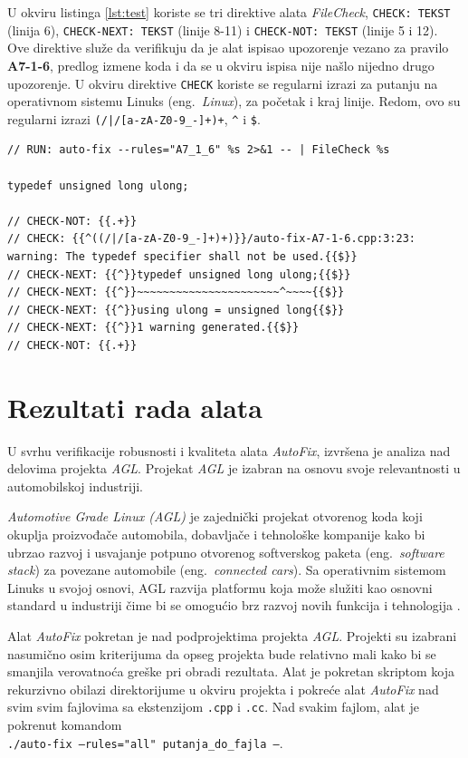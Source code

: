 \documentclass[12pt,oneside]{memoir}
\begin{document}
 U okviru listinga \ref{lst:test} koriste se tri direktive alata \textit{FileCheck}, \texttt{CHECK: TEKST} (linija 6), \texttt{CHECK-NEXT: TEKST} (linije 8-11) i \texttt{CHECK-NOT: TEKST} (linije 5 i 12). Ove direktive slu\v{z}e da verifikuju da je alat ispisao upozorenje vezano za pravilo \textbf{A7-1-6}, predlog izmene koda i da se u okviru ispisa nije na\v{s}lo nijedno drugo upozorenje. U okviru direktive \texttt{CHECK} koriste se regularni izrazi za putanju na operativnom sistemu Linuks (eng.~\textit{Linux}), za po\v{c}etak i kraj linije. Redom, ovo su regularni izrazi \lstinline[style=custombash]{(/|/[a-zA-Z0-9_-]+)+}, \lstinline[style=custombash]{^} i \lstinline[style=custombash]{$}. 


\begin{lstlisting}[style=customc, caption={Pojednostavljeni primer testa za pravilo \textbf{A7-1-6} u okviru alata \textit{AutoFix}.},label={lst:test}]
// RUN: auto-fix --rules="A7_1_6" %s 2>&1 -- | FileCheck %s

typedef unsigned long ulong;

// CHECK-NOT: {{.+}}
// CHECK: {{^((/|/[a-zA-Z0-9_-]+)+)}}/auto-fix-A7-1-6.cpp:3:23: warning: The typedef specifier shall not be used.{{$}}
// CHECK-NEXT: {{^}}typedef unsigned long ulong;{{$}}
// CHECK-NEXT: {{^}}~~~~~~~~~~~~~~~~~~~~~~^~~~~{{$}}
// CHECK-NEXT: {{^}}using ulong = unsigned long{{$}}
// CHECK-NEXT: {{^}}1 warning generated.{{$}}
// CHECK-NOT: {{.+}}
\end{lstlisting}

\section{Rezultati rada alata}

U svrhu verifikacije robusnosti i kvaliteta alata \textit{AutoFix}, izvr\v{s}ena je analiza nad delovima projekta \textit{AGL}. Projekat \textit{AGL}
je izabran na osnovu svoje relevantnosti u automobilskoj industriji. \par

\textit{Automotive Grade Linux (AGL)} je zajedni\v{c}ki projekat otvorenog koda koji okuplja proizvođa\v{c}e automobila, dobavlja\v{c}e i tehnolo\v{s}ke kompanije kako bi ubrzao razvoj i usvajanje potpuno otvorenog softverskog paketa (eng.~\textit{software stack}) za povezane automobile (eng.~\textit{connected cars}). Sa operativnim sistemom Linuks u svojoj osnovi, AGL razvija platformu koja mo\v{z}e slu\v{z}iti kao osnovni standard u industriji \v{c}ime bi se omogu\'{c}io brz razvoj novih funkcija i tehnologija \cite{AGL}.
\par
Alat \textit{AutoFix} pokretan je nad podprojektima projekta \textit{AGL}. Projekti su izabrani nasumi\v{c}no osim kriterijuma
da opseg projekta bude relativno mali kako bi se smanjila verovatno\'{c}a gre\v{s}ke pri obradi rezultata. Alat je pokretan skriptom koja rekurzivno 
obilazi direktorijume u okviru projekta i pokre\'{c}e alat \textit{AutoFix} nad  svim
svim fajlovima sa ekstenzijom \texttt{.cpp} i \texttt{.cc}. Nad svakim fajlom, alat je pokrenut komandom \\
\texttt{./auto-fix  --rules="all"  putanja\_do\_fajla  --}.
\end{document}
